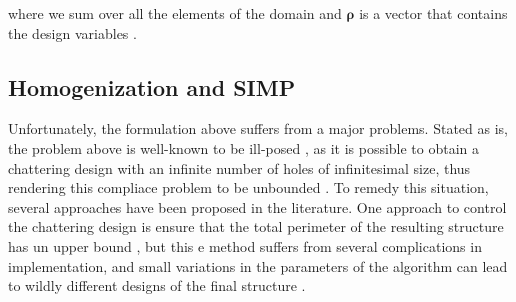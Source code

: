 \documentclass[../main.tex]{subfiles}
\begin{document}
where we sum over all the elements of the domain and $\bm{\rho}$ is a vector that contains the design variables \cite{lazarovFiltersTopologyOptimization2011}. 


\subsection{Homogenization and SIMP}
Unfortunately, the formulation above suffers from a major problems. Stated as is, the problem above is well-known to be ill-posed \cite{kohnOptimalDesignRelaxation1986}, as it is possible to obtain a chattering design with an infinite number of holes of infinitesimal size, thus rendering this compliace problem to be unbounded \cite{liuEfficient3DTopology2014}. To remedy this situation, several approaches have been proposed in the literature. One approach to control the chattering design is ensure that the total perimeter of the resulting structure has un upper bound \cite{haberNewApproachVariabletopology1996} \cite{jogTopologyDesignStructures2002}, but this e method suffers from several complications in implementation, and small variations in the parameters of the algorithm can lead to wildly different designs of the final structure \cite{jogTopologyDesignStructures2002}.
\end{document}
